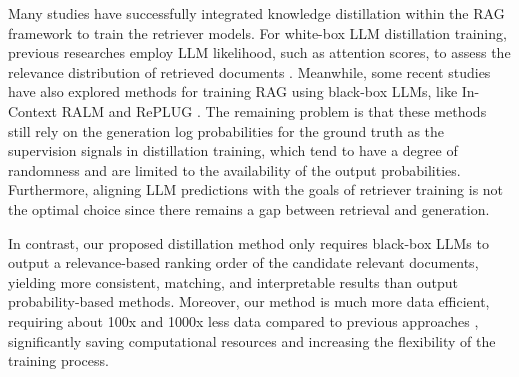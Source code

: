 Many studies have successfully integrated knowledge distillation within the RAG framework to train the retriever models.
For white-box LLM distillation training, previous researches employ LLM likelihood, such as attention scores, to assess the relevance distribution of retrieved documents \cite{izacard2023atlas, izacard2022unsupervised}.
Meanwhile, some recent studies have also explored methods for training RAG using black-box LLMs, like In-Context RALM \cite{ram2023context} and RePLUG \cite{shi2023replug}.
The remaining problem is that these methods still rely on the generation log probabilities for the ground truth as the supervision signals in distillation training, which tend to have a degree of randomness and are limited to the availability of the output probabilities.
Furthermore, aligning LLM predictions with the goals of retriever training is not the optimal choice since there remains a gap between retrieval and generation.

In contrast, our proposed distillation method only requires black-box LLMs to output a relevance-based ranking order of the candidate relevant documents, yielding more consistent, matching, and interpretable results than output probability-based methods.
Moreover, our method is much more data efficient, requiring about 100x and 1000x less data compared to previous approaches \cite{shi2023replug, ram2023context}, significantly saving computational resources and increasing the flexibility of the training process.



